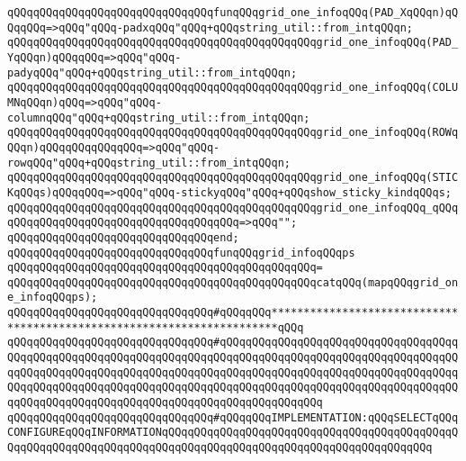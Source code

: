 \newline
\verb|qQQqqQQqqQQqqQQqqQQqqQQqqQQqqQQqfunqQQqgrid_one_infoqQQq(PAD_XqQQqn)qQQqqQQq=>qQQq"qQQq-padxqQQq"qQQq+qQQqstring_util::from_intqQQqn;|\newline
\verb|qQQqqQQqqQQqqQQqqQQqqQQqqQQqqQQqqQQqqQQqqQQqqQQqgrid_one_infoqQQq(PAD_YqQQqn)qQQqqQQq=>qQQq"qQQq-padyqQQq"qQQq+qQQqstring_util::from_intqQQqn;|\newline
\verb|qQQqqQQqqQQqqQQqqQQqqQQqqQQqqQQqqQQqqQQqqQQqqQQqgrid_one_infoqQQq(COLUMNqQQqn)qQQq=>qQQq"qQQq-columnqQQq"qQQq+qQQqstring_util::from_intqQQqn;|\newline
\verb|qQQqqQQqqQQqqQQqqQQqqQQqqQQqqQQqqQQqqQQqqQQqqQQqgrid_one_infoqQQq(ROWqQQqn)qQQqqQQqqQQqqQQq=>qQQq"qQQq-rowqQQq"qQQq+qQQqstring_util::from_intqQQqn;|\newline
\verb|qQQqqQQqqQQqqQQqqQQqqQQqqQQqqQQqqQQqqQQqqQQqqQQqgrid_one_infoqQQq(STICKqQQqs)qQQqqQQq=>qQQq"qQQq-stickyqQQq"qQQq+qQQqshow_sticky_kindqQQqs;|\newline
\verb|qQQqqQQqqQQqqQQqqQQqqQQqqQQqqQQqqQQqqQQqqQQqqQQqgrid_one_infoqQQq_qQQqqQQqqQQqqQQqqQQqqQQqqQQqqQQqqQQqqQQq=>qQQq"";|\newline
\verb|qQQqqQQqqQQqqQQqqQQqqQQqqQQqqQQqend;|\newline
\newline
\verb|qQQqqQQqqQQqqQQqqQQqqQQqqQQqqQQqfunqQQqgrid_infoqQQqps|\newline
\verb|qQQqqQQqqQQqqQQqqQQqqQQqqQQqqQQqqQQqqQQqqQQqqQQq=|\newline
\verb|qQQqqQQqqQQqqQQqqQQqqQQqqQQqqQQqqQQqqQQqqQQqqQQqcatqQQq(mapqQQqgrid_one_infoqQQqps);|\newline
\newline
\newline
\verb|qQQqqQQqqQQqqQQqqQQqqQQqqQQqqQQq#qQQqqQQq***********************************************************************qQQq|\newline
\verb|qQQqqQQqqQQqqQQqqQQqqQQqqQQqqQQq#qQQqqQQqqQQqqQQqqQQqqQQqqQQqqQQqqQQqqQQqqQQqqQQqqQQqqQQqqQQqqQQqqQQqqQQqqQQqqQQqqQQqqQQqqQQqqQQqqQQqqQQqqQQqqQQqqQQqqQQqqQQqqQQqqQQqqQQqqQQqqQQqqQQqqQQqqQQqqQQqqQQqqQQqqQQqqQQqqQQqqQQqqQQqqQQqqQQqqQQqqQQqqQQqqQQqqQQqqQQqqQQqqQQqqQQqqQQqqQQqqQQqqQQqqQQqqQQqqQQqqQQqqQQqqQQqqQQqqQQqqQQqqQQqqQQqqQQq|\newline
\verb|qQQqqQQqqQQqqQQqqQQqqQQqqQQqqQQq#qQQqqQQqIMPLEMENTATION:qQQqSELECTqQQqCONFIGUREqQQqINFORMATIONqQQqqQQqqQQqqQQqqQQqqQQqqQQqqQQqqQQqqQQqqQQqqQQqqQQqqQQqqQQqqQQqqQQqqQQqqQQqqQQqqQQqqQQqqQQqqQQqqQQqqQQqqQQqqQQq|\newline
